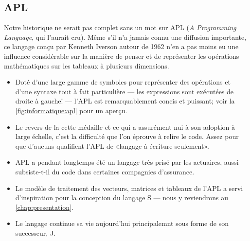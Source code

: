 \subsection{APL}
\label{sec:informatique:historique:apl}

Notre historique ne serait pas complet sans un mot sur APL (\emph{A
  Programming Language}, qui l'aurait cru). Même s'il n'a jamais connu
une diffusion importante, ce langage conçu par Kenneth Iverson autour
de 1962 n'en a pas moins eu une influence considérable sur la manière
de penser et de représenter les opérations mathématiques sur les
tableaux à plusieurs dimensions.

\begin{itemize}
\item Doté d'une large gamme de symboles pour représenter des
  opérations et d'une syntaxe tout à fait particulière --- les
  expressions sont exécutées de droite à gauche! --- l'APL est
  remarquablement concis et puissant; voir la
  \autoref{fig:informatique:apl} pour un aperçu.
\item Le revers de la cette médaille et ce qui a assurément nui à son
  adoption à large échelle, c'est la difficulté que l'on éprouve à
  relire le code. Assez pour que d'aucuns qualifient l'APL de «langage
  à écriture seulement».
\item APL a pendant longtemps été un langage très prisé par les
  actuaires, aussi subsiste-t-il du code dans certaines compagnies
  d'assurance.
\item Le modèle de traitement des vecteurs, matrices et tableaux de
  l'APL a servi d'inspiration pour la conception du langage S --- nous
  y reviendrons au \autoref{chap:presentation}.
\item Le langage continue sa vie aujourd'hui principalemnt sous forme
  de son successeur, J.
\end{itemize}

